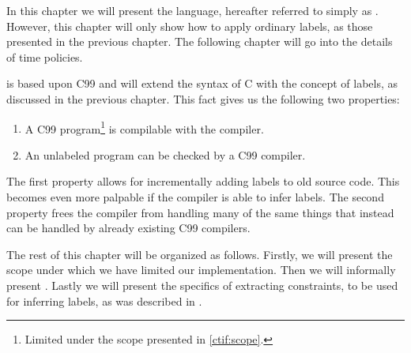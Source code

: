 
In this chapter we will present the \thelanglong{} language, hereafter referred to simply as \thelang.
However, this chapter will only show how to apply ordinary labels, as those presented in the previous chapter.
The following chapter will go into the details of time policies.

\thelang{} is based upon C99 and will extend the syntax of C with the concept of labels, as discussed in the previous chapter.
This fact gives us the following two properties:
\begin{enumerate}
  \item A C99 program\footnote{Limited under the scope presented in \cref{ctif:scope}.} is compilable with the \thelang{} compiler.
  \item An unlabeled \thelang{} program can be checked by a C99 compiler.
\end{enumerate}
The first property allows for incrementally adding labels to old source code.
This becomes even more palpable if the \thelang{} compiler is able to infer labels.
The second property frees the \thelang{} compiler from handling many of the same things that instead can be handled by already existing C99 compilers.

The rest of this chapter will be organized as follows.
Firstly, we will present the scope under which we have limited our implementation.
Then we will informally present \thelang.
Lastly we will present the specifics of extracting constraints, to be used for inferring labels, as was described in .
